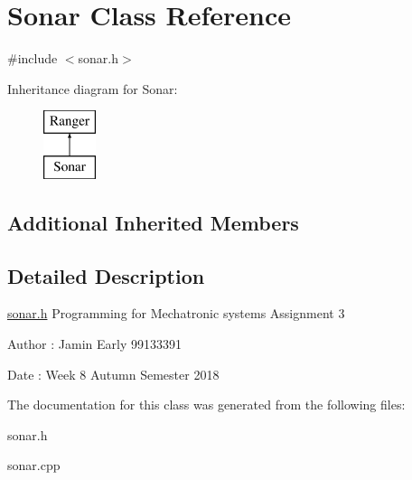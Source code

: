 \hypertarget{classSonar}{}\section{Sonar Class Reference}
\label{classSonar}


{\ttfamily \#include $<$sonar.\+h$>$}

Inheritance diagram for Sonar\+:\begin{figure}[H]
\begin{center}
\leavevmode
\includegraphics[height=2.000000cm]{classSonar}
\end{center}
\end{figure}
\subsection*{Additional Inherited Members}


\subsection{Detailed Description}
\hyperlink{sonar_8h_source}{sonar.\+h} Programming for Mechatronic systems Assignment 3

\begin{DoxyAuthor}{Author}
\+: Jamin Early 99133391 
\end{DoxyAuthor}
\begin{DoxyDate}{Date}
\+: Week 8 Autumn Semester 2018 
\end{DoxyDate}


The documentation for this class was generated from the following files\+:\begin{DoxyCompactItemize}
\item 
sonar.\+h\item 
sonar.\+cpp\end{DoxyCompactItemize}
